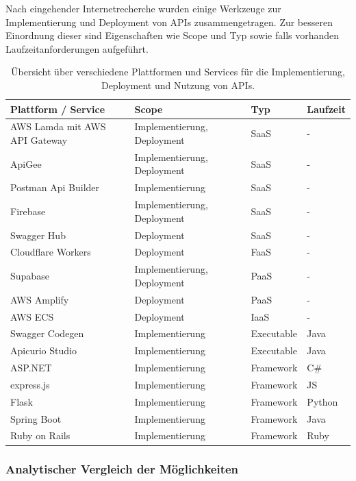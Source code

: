 \documentclass[notitlepage, hidelinks]{article}
\begin{document}
Nach eingehender Internetrecherche wurden einige Werkzeuge zur Implementierung und Deployment von APIs zusammengetragen. Zur besseren Einordnung dieser sind Eigenschaften wie Scope und Typ sowie falls vorhanden Laufzeitanforderungen aufgeführt. 

\begin{table}[h]
\centering
\begin{tabular}{|L{4cm}|L{3cm}|L{2cm}|L{2cm}|}
\hline
\textbf{Plattform / Service} & \textbf{Scope} & \textbf{Typ} & \textbf{Laufzeit} \\ \hline
AWS Lamda mit AWS API Gateway & Implementierung, Deployment & SaaS & - \\ \hline
ApiGee & Implementierung, Deployment & SaaS & - \\ \hline
Postman Api Builder & Implementierung & SaaS & - \\ \hline
Firebase & Implementierung, Deployment & SaaS & - \\ \hline
Swagger Hub & Deployment & SaaS & - \\ \hline
Cloudflare Workers & Deployment & FaaS & - \\ \hline
Supabase & Implementierung, Deployment & PaaS & - \\ \hline
AWS Amplify & Deployment & PaaS & - \\ \hline
AWS ECS & Deployment & IaaS & - \\ \hline
Swagger Codegen & Implementierung & Executable & Java \\ \hline
Apicurio Studio & Implementierung & Executable & Java \\ \hline
ASP.NET & Implementierung & Framework & C\# \\ \hline
express.js & Implementierung & Framework & JS \\ \hline
Flask & Implementierung & Framework & Python \\ \hline
Spring Boot & Implementierung & Framework & Java \\ \hline
Ruby on Rails & Implementierung & Framework & Ruby \\ \hline
\end{tabular}
\caption{Übersicht über verschiedene Plattformen und Services für die Implementierung, Deployment und Nutzung von APIs.}
\label{api-platforms}
\end{table}


\subsubsection{Analytischer Vergleich der Möglichkeiten}
\end{document}
